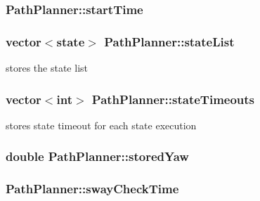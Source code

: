 \subsubsection[{\texorpdfstring{start\+Time}{startTime}}]{ Path\+Planner\+::start\+Time}\hypertarget{classPathPlanner_a201a2c207e4abfee915a7acd5c9cae0e}{}\label{classPathPlanner_a201a2c207e4abfee915a7acd5c9cae0e}
\subsubsection[{\texorpdfstring{state\+List}{stateList}}]{\setlength{\rightskip}{0pt plus 5cm}vector$<${\bf state}$>$ Path\+Planner\+::state\+List}\hypertarget{classPathPlanner_aef62d7f3ef83d7170d87bfe689d1eecd}{}\label{classPathPlanner_aef62d7f3ef83d7170d87bfe689d1eecd}


stores the state list 

\subsubsection[{\texorpdfstring{state\+Timeouts}{stateTimeouts}}]{\setlength{\rightskip}{0pt plus 5cm}vector$<$int$>$ Path\+Planner\+::state\+Timeouts}\hypertarget{classPathPlanner_ac1db41115e7596c58fbc5e0a80b7e4cb}{}\label{classPathPlanner_ac1db41115e7596c58fbc5e0a80b7e4cb}


stores state timeout for each state execution 

\subsubsection[{\texorpdfstring{stored\+Yaw}{storedYaw}}]{\setlength{\rightskip}{0pt plus 5cm}double Path\+Planner\+::stored\+Yaw}\hypertarget{classPathPlanner_ab3c86e85339eedec45c050955ca9a6b9}{}\label{classPathPlanner_ab3c86e85339eedec45c050955ca9a6b9}
\subsubsection[{\texorpdfstring{sway\+Check\+Time}{swayCheckTime}}]{ Path\+Planner\+::sway\+Check\+Time}\hypertarget{classPathPlanner_a579c296b95e4dcb2f7e7b56b90082184}{}\label{classPathPlanner_a579c296b95e4dcb2f7e7b56b90082184}
